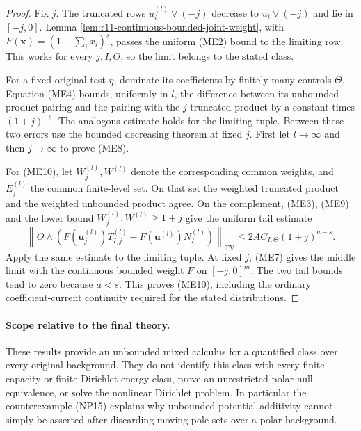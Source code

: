 \documentclass[11pt,a4paper]{article}
\numberwithin{equation}{section}
\theoremstyle{definition}
\theoremstyle{remark}
\begin{document}
\begin{proof}
Fix $j$.  The truncated rows $u_i^{(l)}\vee(-j)$ decrease to
$u_i\vee(-j)$ and lie in $[-j,0]$.  Lemma
\ref{lem:r11-continuous-bounded-joint-weight}, with
$F(\mathbf x)=(1-\sum_i x_i)^s$, passes the uniform (ME2) bound
to the limiting row.  This works for every $j,I,\Theta$, so the
limit belongs to the stated class.

For a fixed original test $\eta$, dominate its coefficients by
finitely many controls $\Theta$.  Equation (ME4) bounds, uniformly
in $l$, the difference between its unbounded product pairing and
the pairing with the $j$-truncated product by a constant times
$(1+j)^{-s}$.  The analogous estimate holds for the limiting tuple.
Between these two errors use the bounded decreasing theorem at fixed
$j$.  First let $l\to\infty$ and then $j\to\infty$ to prove (ME8).

For (ME10), let $W_j^{(l)},W^{(l)}$ denote the corresponding common
weights, and $E_j^{(l)}$ the common finite-level set.  On that set
the weighted truncated product and the weighted unbounded product
agree.  On the complement, (ME3), (ME9) and the lower bound
$W_j^{(l)},W^{(l)}\geq1+j$ give the uniform tail estimate
\[
 \left\|\Theta\wedge\left(
 F(\mathbf u_j^{(l)})T_{I,j}^{(l)}
       -F(\mathbf u^{(l)})N_I^{(l)}\right)\right\|_{\mathrm{TV}}
       \leq2A C_{I,\Theta}(1+j)^{a-s}.
 \tag{ME11}
\]
Apply the same estimate to the limiting tuple.  At fixed $j$, (ME7)
gives the middle limit with the continuous bounded weight $F$ on
$[-j,0]^m$.  The two tail bounds tend to zero because $a<s$.
This proves (ME10), including the ordinary coefficient-current
continuity required for the stated distributions.
\end{proof}

\paragraph{Scope relative to the final theory.}
These results provide an unbounded mixed calculus for a quantified
class over every original background.  They do not identify this class
with every finite-capacity or finite-Dirichlet-energy class, prove an
unrestricted polar-null equivalence, or solve the nonlinear Dirichlet
problem.  In particular the counterexample (NP15) explains why
unbounded potential additivity cannot simply be asserted after
discarding moving pole sets over a polar background.

\end{document}
